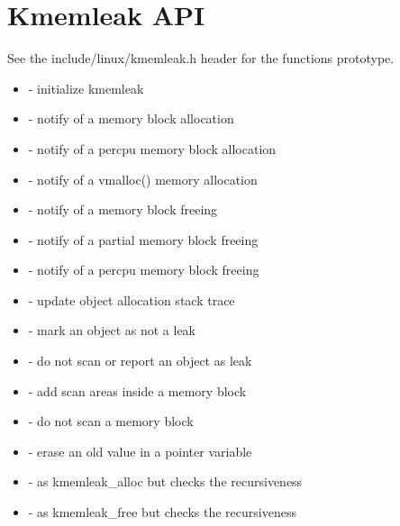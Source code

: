 \documentclass[a4paper,8pt,english]{sphinxmanual}
\begin{document}
\section{Kmemleak API}
\label{dev-tools/kmemleak:kmemleak-api}
See the include/linux/kmemleak.h header for the functions prototype.
\begin{itemize}
\item {} 
              - initialize kmemleak

\item {} 
             - notify of a memory block allocation

\item {} 
      - notify of a percpu memory block allocation

\item {} 
           - notify of a vmalloc() memory allocation

\item {} 
              - notify of a memory block freeing

\item {} 
         - notify of a partial memory block freeing

\item {} 
       - notify of a percpu memory block freeing

\item {} 
      - update object allocation stack trace

\item {} 
  - mark an object as not a leak

\item {} 
            - do not scan or report an object as leak

\item {} 
         - add scan areas inside a memory block

\item {} 
   - do not scan a memory block

\item {} 
             - erase an old value in a pointer variable

\item {} 
 - as kmemleak\_alloc but checks the recursiveness

\item {} 
    - as kmemleak\_free but checks the recursiveness

\end{itemize}
\end{document}
